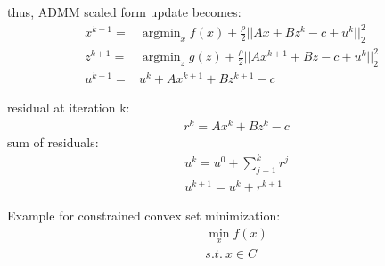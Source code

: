 \documentclass[8pt]{report}
\DeclareMathOperator*{\argmin}{argmin}
\begin{document}
\begin{multicols*}{2}
  thus, ADMM scaled form update becomes:
  \begin{align*}
    x^{k+1} = & \argmin_{x} f(x) + \frac{\rho}{2}||Ax + Bz^k - c + u^k||_2^2\\
    z^{k+1} = & \argmin_{z} g(z) + \frac{\rho}{2}||Ax^{k+1} + Bz - c + u^k||_2^2\\
    u^{k+1} = & u^k + Ax^{k+1} +Bz^{k+1} - c
  \end{align*}

  residual at iteration k:
  \begin{align*}
    &r^k = Ax^k + Bz^k - c
  \end{align*}
  sum of residuals:
  \begin{align*}
    &u^k = u^0 + \sum_{j=1}^{k} r^j\\
    &u^{k+1} = u^k + r^{k+1}
  \end{align*}


  \vfill\null
  
  \pagebreak
  
  Example for constrained convex set minimization:
  \begin{align*}
    &\min_x f(x)\\
    &s.t.\ x \in C
  \end{align*}


\end{multicols*}
\end{document}
